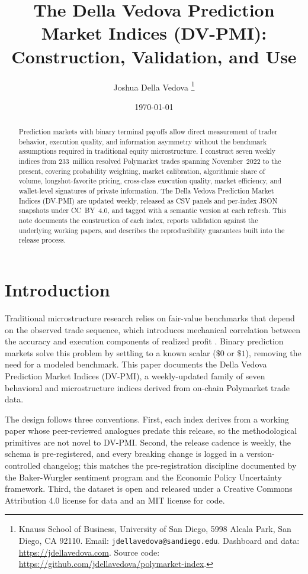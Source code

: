 \documentclass[11pt,letterpaper]{article}
\title{The Della Vedova Prediction Market Indices (DV-PMI):\\
       Construction, Validation, and Use}
\author{Joshua Della Vedova%
  \thanks{Knauss School of Business, University of San Diego,
    5998 Alcala Park, San Diego, CA 92110.
    Email: \texttt{jdellavedova@sandiego.edu}.
    Dashboard and data: \url{https://jdellavedova.com}.
    Source code: \url{https://github.com/jdellavedova/polymarket-index}.}
}
\date{\today}
\begin{document}
\maketitle

\begin{abstract}
\noindent
Prediction markets with binary terminal payoffs allow direct measurement of trader behavior, execution quality, and information asymmetry without the benchmark assumptions required in traditional equity microstructure. I construct seven weekly indices from 233~million resolved Polymarket trades spanning November~2022 to the present, covering probability weighting, market calibration, algorithmic share of volume, longshot-favorite pricing, cross-class execution quality, market efficiency, and wallet-level signatures of private information. The Della Vedova Prediction Market Indices (DV-PMI) are updated weekly, released as CSV panels and per-index JSON snapshots under CC~BY~4.0, and tagged with a semantic version at each refresh. This note documents the construction of each index, reports validation against the underlying working papers, and describes the reproducibility guarantees built into the release process.
\end{abstract}

\section{Introduction}
\label{sec:intro}

Traditional microstructure research relies on fair-value benchmarks that depend on the observed trade sequence, which introduces mechanical correlation between the accuracy and execution components of realized profit \citep{fama1972components,anand2012performance}. Binary prediction markets solve this problem by settling to a known scalar ($\$0$ or $\$1$), removing the need for a modeled benchmark. This paper documents the Della Vedova Prediction Market Indices (DV-PMI), a weekly-updated family of seven behavioral and microstructure indices derived from on-chain Polymarket trade data.

The design follows three conventions. First, each index derives from a working paper whose peer-reviewed analogues predate this release, so the methodological primitives are not novel to DV-PMI. Second, the release cadence is weekly, the schema is pre-registered, and every breaking change is logged in a version-controlled changelog; this matches the pre-registration discipline documented by the Baker-Wurgler sentiment program and the Economic Policy Uncertainty framework. Third, the dataset is open and released under a Creative Commons Attribution 4.0 license for data and an MIT license for code.
\end{document}
